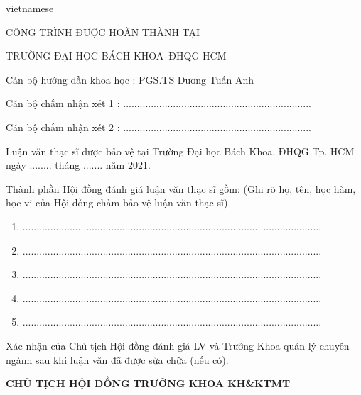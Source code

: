 \begin{titlepage}
\begin{otherlanguage*}{vietnamese}
\begin{center}
CÔNG TRÌNH ĐƯỢC HOÀN THÀNH TẠI

TRƯỜNG ĐẠI HỌC BÁCH KHOA–ĐHQG-HCM
\end{center}

\vspace*{3\bigskipamount}

Cán bộ hướng dẫn khoa học : PGS.TS Dương Tuấn Anh

\vspace*{1\bigskipamount}

Cán bộ chấm nhận xét 1 : ....................................................................

\vspace*{1\bigskipamount}

Cán bộ chấm nhận xét 2 : ....................................................................

\vspace*{1\bigskipamount}

Luận văn thạc sĩ được bảo vệ tại Trường Đại học Bách Khoa, ĐHQG Tp. HCM ngày ........  tháng ....... năm 2021. 

\vspace*{1\bigskipamount}

Thành phần Hội đồng đánh giá luận văn thạc sĩ gồm:
(Ghi  rõ họ, tên, học hàm, học vị của Hội đồng chấm bảo vệ luận văn thạc sĩ)
\begin{enumerate}
\item ............................................................................................................
\item ............................................................................................................
\item ............................................................................................................
\item ............................................................................................................
\item ............................................................................................................
\end{enumerate}

\vspace*{2\bigskipamount}

Xác nhận của Chủ tịch Hội đồng đánh giá LV và Trưởng Khoa quản lý chuyên ngành sau khi luận văn đã được sửa chữa (nếu có).

\vspace*{2\bigskipamount}

\textbf{CHỦ TỊCH HỘI ĐỒNG}
\hfill
\textbf{TRƯỞNG KHOA KH\&KTMT}

\end{otherlanguage*}
\end{titlepage}

